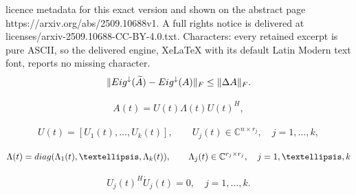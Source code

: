 \documentclass[10pt,a4paper]{amsart}
\newcommand {\diag}  {\mathop{\rm diag}\nolimits}
\newcommand {\mat} [1] {\left[\begin{array}{#1}}
\newcommand {\rix}     {\end{array}\right]}
\newcommand {\setC}  {{\mathbb C}}
\newcommand {\wt} {\widetilde}
\begin{document}
licence metadata for this exact version and shown on the abstract page https://arxiv.org/abs/2509.10688v1. A full rights notice is delivered at licenses/arxiv-2509.10688-CC-BY-4.0.txt. Characters: every retained excerpt is pure ASCII, so the delivered engine, XeLaTeX with its default Latin Modern text font, reports no missing character.
\begin{eqnarray}\label{c-121}
\|{\rm Eig}^{\downarrow}(\wt A)-{\rm Eig}^{\downarrow}(A)\|_F\leq \|\Delta A\|_F.
\end{eqnarray}

\begin{eqnarray}\label{spectral}
A(t)=U(t)\Lambda(t)U(t)^H,
\end{eqnarray}

\begin{eqnarray}\label{bku}
U(t)=\left[U_1(t),\ldots,U_k(t)\right],\qquad U_j(t)\in\setC^{n\times r_j}, \quad j=1,\ldots,k,
\end{eqnarray}

\begin{eqnarray}\label{bkl}
\Lambda(t)=\diag(\Lambda_1(t),\ldots,\Lambda_k(t)),\qquad
\Lambda_j(t)\in{\setC}^{r_j\times r_j},\quad j=1,\ldots,k
\end{eqnarray}

\begin{eqnarray}\label{c-2-3}
U_j(t)^H\dot U_j(t)=0,\quad j=1,\ldots,k.
\end{eqnarray}
\end{document}
